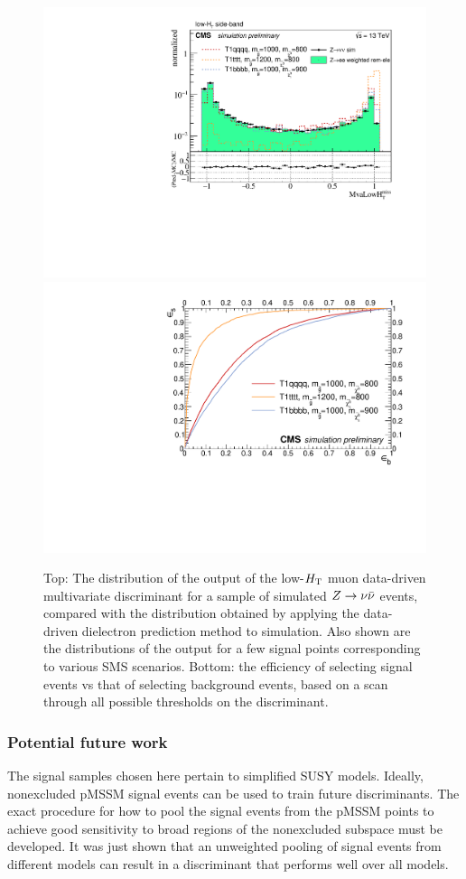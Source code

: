 $$\begin{figure}[h]
\centering
\includegraphics[width=0.7\linewidth]{figures/SusySearches/MvaLowHt.pdf}
\includegraphics[width=0.7\linewidth]{figures/SusySearches/RocCurvesLowHt_ZinvVsSUSY.pdf}
\caption{Top: The distribution of the output of the low-$\Ht$ muon data-driven multivariate discriminant for a sample of simulated $\zinv$ events, compared with the distribution obtained by applying the data-driven dielectron prediction method to simulation. Also shown are the distributions of the output for a few signal points corresponding to various SMS scenarios. Bottom: the efficiency of selecting signal events vs that of selecting background events, based on a scan through all possible thresholds on the discriminant.}
\label{fig:SusyBdt2}
\end{figure}

\subsubsection{Potential future work}
The signal samples chosen here pertain to simplified SUSY models. Ideally, nonexcluded pMSSM signal events can be used to train future discriminants. The exact procedure for how to pool the signal events from the pMSSM points to achieve good sensitivity to broad regions of the nonexcluded subspace must be developed. It was just shown that an unweighted pooling of signal events from different models can result in a discriminant that performs well over all models. 

